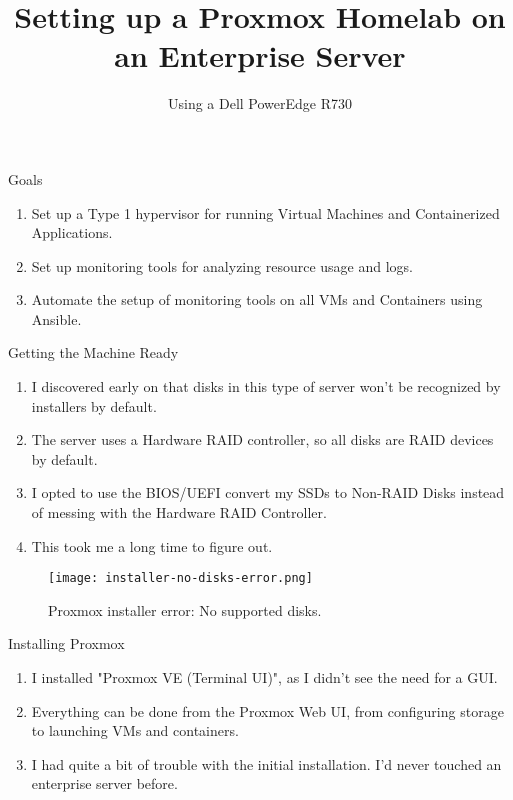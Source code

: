 \documentclass[14pt,compress,usenames,dvipsnames,aspectratio=169]{beamer}
\title{\textbf{Setting up a Proxmox Homelab on an Enterprise Server}}
\author{Using a Dell PowerEdge R730}
\date{}  %
\begin{document}

\begin{frame}[plain]
\titlepage
\end{frame}


\begin{frame}{Goals}
    \begin{enumerate}
        \item{Set up a Type 1 hypervisor for running Virtual Machines and
            Containerized Applications.} 
        \item{Set up monitoring tools for analyzing resource usage and logs. }
        \item{Automate the setup of monitoring tools on all VMs and Containers using
            Ansible.}
    \end{enumerate}
\end{frame}


\begin{frame}{Getting the Machine Ready}
    \begin{enumerate}
        \item{I discovered early on that disks in this type of server won't be recognized by installers by default.} 
        \item{The server uses a Hardware RAID controller, so all disks are RAID devices by default.}
        \item{I opted to use the BIOS/UEFI convert my SSDs to Non-RAID Disks instead of messing with the Hardware RAID Controller.}
        \item{This took me a long time to figure out.}
    \end{enumerate}
    \begin{figure}
        \centering
        \texttt{[image: installer-no-disks-error.png]}  

        \caption{Proxmox installer error: No supported disks.}
        \label{fig:Proxmox installer error - no disks.}
    \end{figure}
\end{frame}


\begin{frame}{Installing Proxmox}
    \begin{enumerate}
        \item{I installed "Proxmox VE (Terminal UI)", as I didn't see the need for a
        GUI.} 
        \item{Everything can be done from the Proxmox Web UI, from configuring
        storage to launching VMs and containers.}
        \item{I had quite a bit of trouble with the initial installation. I'd never
            touched an enterprise server before.}
    \end{enumerate}
\end{frame}
\end{document}
